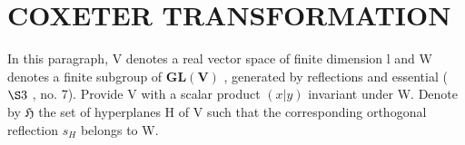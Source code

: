 \section{COXETER TRANSFORMATION}

In this paragraph, V denotes a real vector space of finite dimension l and W denotes a finite subgroup of \(\mathbf{GL}(\mathbf{V})\) , generated by reflections and essential ( \(\S3\) , no. 7). Provide V with a scalar product \((x|y)\) invariant under W. Denote by \(\mathfrak{H}\) the set of hyperplanes H of V such that the corresponding orthogonal reflection \(s_{H}\) belongs to W.


